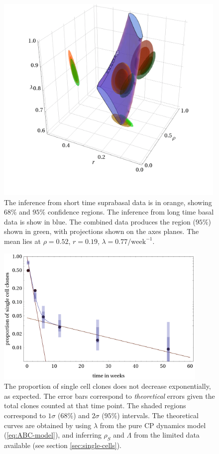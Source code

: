 \documentclass[10pt,UKenglish]{article}
\begin{document}
\begin{figure}[htb]
	\centering
	\includegraphics[height=4in]{oes-combined-prior.png}
	\caption{\label{fig:inferences}The inference from short time suprabasal
	data is in orange, showing $68\%$ and $95\%$ confidence regions. The
	inference from long time basal data is show in blue. The combined data
	produces the region ($95\%$) shown in green, with projections shown on
	the axes planes. The mean lies at $\rho = 0.52$, $r = 0.19$, $\lambda =
	0.77/\textrm{week}^{-1}$.}
\end{figure}

\begin{figure}[htb]
	\centering
	\includegraphics[width=4in]{single-cell-clones.png}
	\caption{\label{fig:single-cell}The proportion of single cell clones
	does not decrease exponentially, as expected. The error bars correspond
	to \emph{theoretical} errors given the total clones counted at that time
	point. The shaded regions correspond to $1\sigma$ ($68\%$) and $2\sigma$
	($95\%$) intervals. The theoretical curves are obtained by using
	$\lambda$ from the pure CP dynamics model (\ref{eq:ABC-model}), and
	inferring $\rho_S$ and $\Lambda$ from the limited data available (see
	section \ref{sec:single-cells}).}
\end{figure}
\end{document}
